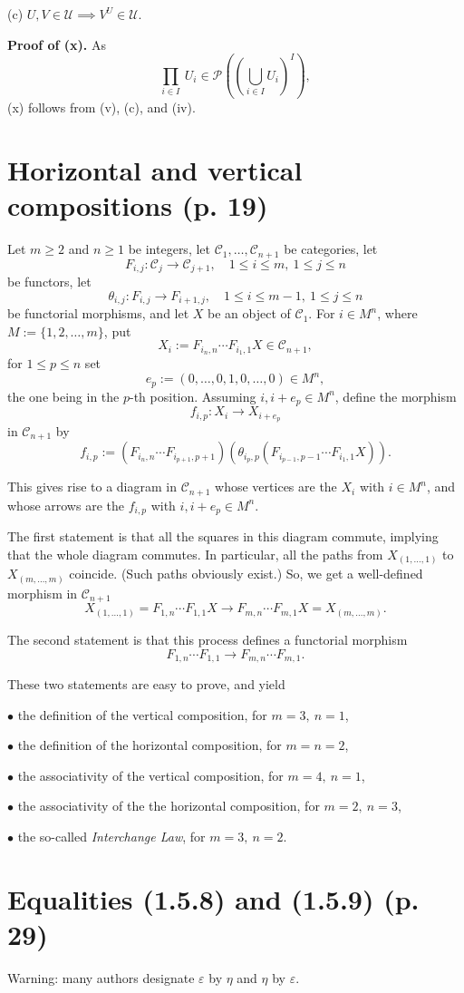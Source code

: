 \documentclass[12pt]{article}
\theoremstyle{remark}
\newcommand{\bu}{\bullet}
\newcommand{\n}{\noindent}
\newcommand{\C}{\mathcal C}
\newcommand{\e}{\varepsilon}
\begin{document}
(c) $U,V\in\mathcal U\implies V^U\in\mathcal U$. 

\n\textbf{Proof of (x).} As 
$$
\prod_{i\in I}\ U_i\in\mathcal P\left(\left(\bigcup_{i\in I}U_i\right)^I\right),
$$
(x) follows from (v), (c), and (iv). 
%
\section{Horizontal and vertical compositions (p. 19)}%
%
Let $m\ge2$ and $n\ge1$ be integers, let $\C_1,\dots,\C_{n+1}$ be categories, let 
$$
F_{i,j}:\C_j\to\C_{j+1},\quad1\le i\le m,\ 1\le j\le n
$$
be functors, let 
$$
\theta_{i,j}:F_{i,j}\to F_{i+1,j},\quad1\le i\le m-1,\ 1\le j\le n
$$
be functorial morphisms, and let $X$ be an object of $\C_1$. For $i\in M^n$, where $M:=\{1,2,\dots,m\}$, put 
$$
X_i:=F_{i_n,n}\cdots F_{i_1,1}X\in\C_{n+1},
$$
for $1\le p\le n$ set 
$$
e_p:=(0,\dots,0,1,0,\dots,0)\in M^n,
$$
the one being in the $p$-th position. Assuming $i,i+e_p\in M^n$, define the morphism 
$$
f_{i,p}:X_i\to X_{i+e_p}
$$
in $\C_{n+1}$ by 
$$
f_{i,p}:=(F_{i_n,n}\cdots F_{i_{p+1},p+1})(\theta_{i_p,p}(F_{i_{p-1},p-1}\cdots F_{i_1,1}X)).
$$

This gives rise to a diagram in $\C_{n+1}$ whose vertices are the $X_i$ with $i\in M^n$, and whose arrows are the $f_{i,p}$ with $i,i+e_p\in M^n$.

The first statement is that all the squares in this diagram commute, implying that the whole diagram commutes. In particular, all the paths from $X_{(1,\dots,1)}$ to $X_{(m,\dots,m)}$ coincide. (Such paths obviously exist.) So, we get a well-defined morphism in $\C_{n+1}$
$$
X_{(1,\dots,1)}=F_{1,n}\cdots F_{1,1}X\to F_{m,n}\cdots F_{m,1}X=X_{(m,\dots,m)}.
$$

The second statement is that this process defines a functorial morphism 
$$
F_{1,n}\cdots F_{1,1}\to F_{m,n}\cdots F_{m,1}.
$$

These two statements are easy to prove, and yield 

\n$\bu$ the definition of the vertical composition, for $m=3,\ n=1$,

\n$\bu$ the definition of the horizontal composition, for $m=n=2$,

\n$\bu$ the associativity of the vertical composition, for $m=4,\ n=1$,

\n$\bu$ the associativity of the the horizontal composition, for $m=2,\ n=3$,

\n$\bu$ the so-called \emph{Interchange Law}, for $m=3,\ n=2$.
%
\section{Equalities (1.5.8) and (1.5.9) (p. 29)}%
%
Warning: many authors designate $\e$ by $\eta$ and $\eta$ by $\e$. 
\end{document}
